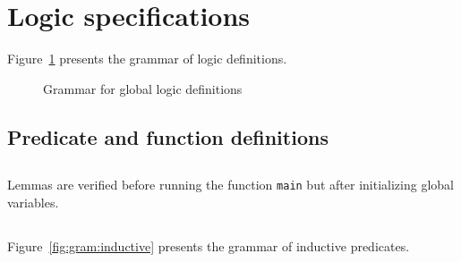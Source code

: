 
\section{Logic specifications}
\label{sec:logicspec}

\nodiff

Figure~\ref{fig:gram:logic} presents the grammar of logic definitions.

\begin{figure}[htbp]
  \caption{Grammar for global logic definitions}
\label{fig:gram:logic}
\end{figure}


\subsection{Predicate and function definitions}
\nodiff


\subsection{}
\nodiff

Lemmas are verified before running the function \lstinline|main| but after
initializing global variables.


\subsection{}
\label{sec:inductivepredicates}
\experimental

\nodiff

Figure~\ref{fig:gram:inductive} presents the grammar of inductive predicates.

